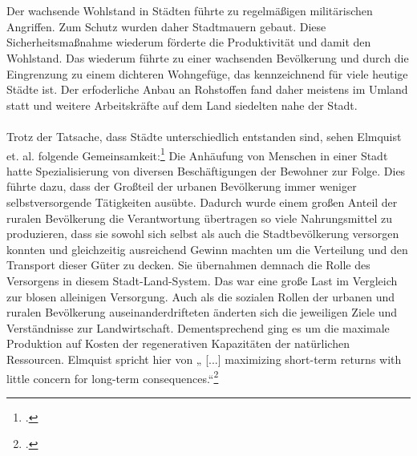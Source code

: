 \documentclass{scrartcl}
\begin{document}
\\
\\
Der wachsende Wohlstand in Städten führte zu regelmäßigen militärischen Angriffen. Zum Schutz wurden daher Stadtmauern gebaut. Diese Sicherheitsmaßnahme wiederum förderte die Produktivität und damit den Wohlstand. Das wiederum führte zu einer wachsenden Bevölkerung und durch die Eingrenzung zu einem dichteren Wohngefüge, das kennzeichnend für viele heutige Städte ist. Der erfoderliche Anbau an Rohstoffen fand daher meistens im Umland statt und weitere Arbeitskräfte auf dem Land siedelten nahe der Stadt. \\
\\
Trotz der Tatsache, dass Städte unterschiedlich entstanden sind, sehen Elmquist et. al. folgende Gemeinsamkeit:\footcite[Vgl.][S.19ff]{Elmqvist2013} Die Anhäufung von Menschen in einer Stadt hatte Spezialisierung von diversen Beschäftigungen der Bewohner zur Folge. Dies führte dazu, dass der Großteil der urbanen Bevölkerung immer weniger selbstversorgende Tätigkeiten ausübte. Dadurch wurde einem großen Anteil der ruralen Bevölkerung die Verantwortung übertragen so viele Nahrungsmittel zu produzieren, dass sie sowohl sich selbst als auch die Stadtbevölkerung versorgen konnten und gleichzeitig ausreichend Gewinn machten um die Verteilung und den Transport dieser Güter zu decken. Sie übernahmen demnach die Rolle des Versorgens in diesem Stadt-Land-System. Das war eine große Last im Vergleich zur blosen alleinigen Versorgung. Auch als die sozialen Rollen der urbanen und ruralen Bevölkerung auseinanderdrifteten änderten sich die jeweiligen Ziele und Verständnisse zur Landwirtschaft. Dementsprechend ging es um die maximale Produktion auf Kosten der regenerativen Kapazitäten der natürlichen Ressourcen. Elmquist spricht hier von  „ [...] maximizing short-term returns with little concern for long-term consequences.“\footcite[S.20]{Elmqvist2013}
\end{document}
